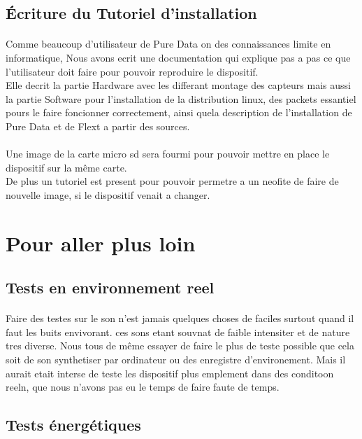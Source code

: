 \documentclass[a4paper, titlepage, oneside, 12pt]{article}%
\begin{document}
\subsection{Écriture du Tutoriel d'installation}
\paragraph{}
Comme beaucoup d'utilisateur de Pure Data on des connaissances limite en informatique, Nous avons ecrit une documentation qui explique pas a pas ce que l'utilisateur doit faire pour pouvoir reproduire le dispositif.\\
Elle decrit la partie Hardware avec les differant montage des capteurs mais aussi la partie Software pour l'installation de la distribution linux, des packets essantiel pours le faire foncionner correctement, ainsi quela description de l'installation de Pure Data et de Flext a partir des sources.

\paragraph{}
Une image de la carte micro sd sera fourmi pour pouvoir mettre en place le dispositif sur la même carte.\\
De plus un tutoriel est present pour pouvoir permetre a un neofite de faire de nouvelle image, si le dispositif venait a changer.

\section{Pour aller plus loin}
\subsection{Tests en environnement reel}
\paragraph{}
Faire des testes sur le son n'est jamais quelques choses de faciles surtout quand il faut les buits envivorant. ces sons etant souvnat de faible intensiter et de nature tres diverse.
Nous tous de même essayer de faire le plus de teste possible que cela soit de son synthetiser par ordinateur ou des enregistre d'environement. Mais il aurait etait interse de teste les dispositif plus emplement dans des conditoon reeln, que nous n'avons pas eu le temps de faire faute de temps. 

\subsection{Tests énergétiques}
\end{document}
